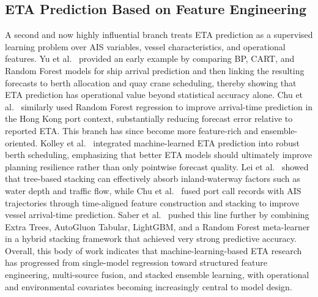 \documentclass[conference]{IEEEtran}
\begin{document}
\subsection{ETA Prediction Based on Feature Engineering}
A second and now highly influential branch treats ETA prediction as a supervised learning problem over AIS variables, vessel characteristics, and operational features. Yu et al.~\cite{yuShipArrivalPrediction2018} provided an early example by comparing BP, CART, and Random Forest models for ship arrival prediction and then linking the resulting forecasts to berth allocation and quay crane scheduling, thereby showing that ETA prediction has operational value beyond statistical accuracy alone. Chu et al.~\cite{chuEvaluationPredictionPunctuality2023} similarly used Random Forest regression to improve arrival-time prediction in the Hong Kong port context, substantially reducing forecast error relative to reported ETA. This branch has since become more feature-rich and ensemble-oriented. Kolley et al.~\cite{kolleyRobustBerthScheduling2022} integrated machine-learned ETA prediction into robust berth scheduling, emphasizing that better ETA models should ultimately improve planning resilience rather than only pointwise forecast quality. Lei et al.~\cite{leiPredictingVesselArrival2024} showed that tree-based stacking can effectively absorb inland-waterway factors such as water depth and traffic flow, while Chu et al.~\cite{chuVesselArrivalTime2025} fused port call records with AIS trajectories through time-aligned feature construction and stacking to improve vessel arrival-time prediction. Saber et al.~\cite{saberHighaccuracyPredictionVessels2025} pushed this line further by combining Extra Trees, AutoGluon Tabular, LightGBM, and a Random Forest meta-learner in a hybrid stacking framework that achieved very strong predictive accuracy. Overall, this body of work indicates that machine-learning-based ETA research has progressed from single-model regression toward structured feature engineering, multi-source fusion, and stacked ensemble learning, with operational and environmental covariates becoming increasingly central to model design.

\end{document}
